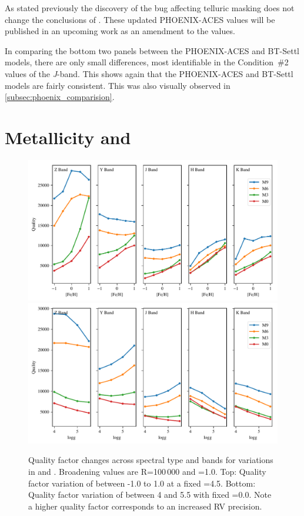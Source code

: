 As stated previously the discovery of the bug affecting telluric masking does not change the conclusions of \citet{figueira_radial_2016}.
These updated {PHOENIX-ACES} values will be published in an upcoming work as an amendment to the \citet{figueira_radial_2016} values.

In comparing the bottom two panels between the {PHOENIX-ACES} and {BT-Settl} models, there are only small differences, most identifiable in the Condition~\#2 values of the \emph{J}-band.
This shows again that the {PHOENIX-ACES} and {BT-Settl} models are fairly consistent.
This was also visually observed in \cref{subsec:phoenix_comparision}.


\section{Metallicity and \texorpdfstring{\Logg{}}{Logg}}
\label{sec:metallicity_logg}
\begin{figure}
    \includegraphics[width=0.95\linewidth]{figures/information-content/metalicity_effect.pdf}\\
    \includegraphics[width=0.95\linewidth]{figures/information-content/logg_effect.pdf}
    \caption[Quality factor verse \feh{} and \Logg{} for different spectral types and wavelength bands.]{Quality factor changes across spectral type and bands for variations in \feh{} and \Logg{}.
        Broadening values are R=100\,000 and \Vsini{}=1.0\kmps{}.
        Top: Quality factor variation of \feh{} between -1.0 to 1.0 at a fixed \Logg{}=4.5.
        Bottom: Quality factor variation of \Logg{} between 4 and 5.5 with fixed \feh{}=0.0.
        Note a higher quality factor corresponds to an increased {RV} precision.}
    \label{fig:logg_metalicity_deviations}
\end{figure}

